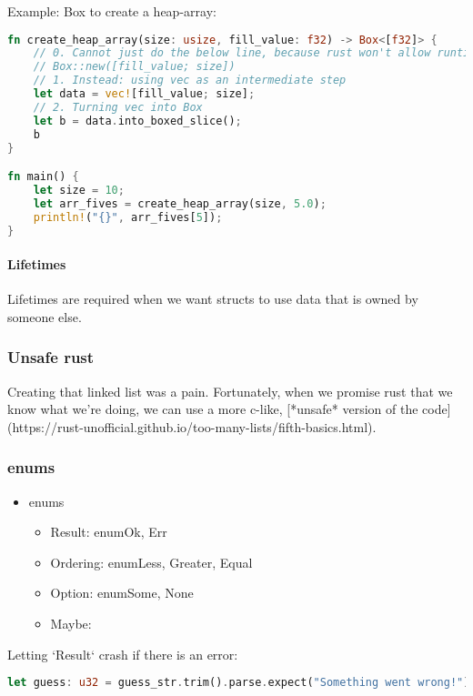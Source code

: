 Example: Box to create a heap-array:
\begin{lstlisting}[language=rust]
fn create_heap_array(size: usize, fill_value: f32) -> Box<[f32]> {
    // 0. Cannot just do the below line, because rust won't allow runtime-sized arrays [fill_val; size]
    // Box::new([fill_value; size]) 
    // 1. Instead: using vec as an intermediate step
    let data = vec![fill_value; size];  
    // 2. Turning vec into Box
    let b = data.into_boxed_slice();  
    b
}

fn main() {
    let size = 10;
    let arr_fives = create_heap_array(size, 5.0);
    println!("{}", arr_fives[5]);
}
\end{lstlisting}

\paragraph{Lifetimes}
Lifetimes are required when we want structs to use data that is owned by someone else.


\subsubsection{Unsafe rust}
Creating that linked list was a pain. Fortunately, when we promise rust that we know what we're doing, we can use a more c-like, [*unsafe* version of the code](https://rust-unofficial.github.io/too-many-lists/fifth-basics.html).

\subsubsection{enums}
\begin{itemize}
    \item enums
    \begin{itemize}
        \item Result: enum{Ok, Err}
        \item Ordering: enum{Less, Greater, Equal}
        \item Option: enum{Some, None}
        \item Maybe:
    \end{itemize}
\end{itemize}

Letting `Result` crash if there is an error:
\begin{lstlisting}[language=rust]
let guess: u32 = guess_str.trim().parse.expect("Something went wrong!");
\end{lstlisting}

